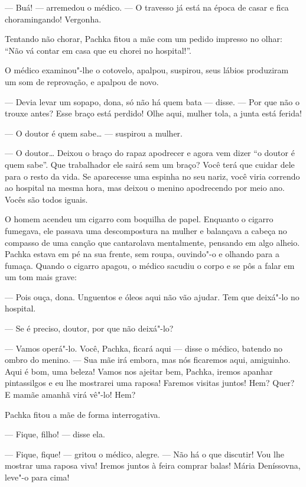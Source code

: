 --- Buá! --- arremedou o médico. --- O travesso já está na época de
casar e fica choramingando! Vergonha.

Tentando não chorar, Pachka fitou a mãe com um pedido impresso no olhar:
``Não vá contar em casa que eu chorei no hospital!''.

O médico examinou"-lhe o cotovelo, apalpou, suspirou, seus lábios
produziram um som de reprovação, e apalpou de novo.

--- Devia levar um sopapo, dona, só não há quem bata --- disse. --- Por
que não o trouxe antes? Esse braço está perdido! Olhe aqui, mulher tola,
a junta está ferida!

--- O doutor é quem sabe\ldots{} --- suspirou a mulher.

--- O doutor\ldots{} Deixou o braço do rapaz apodrecer e agora vem dizer ``o
doutor é quem sabe''. Que trabalhador ele sairá sem um braço? Você terá
que cuidar dele para o resto da vida. Se aparecesse uma espinha no seu
nariz, você viria correndo ao hospital na mesma hora, mas deixou o
menino apodrecendo por meio ano. Vocês são todos iguais.

O homem acendeu um cigarro com boquilha de papel. Enquanto o
cigarro fumegava, ele passava uma descompostura na mulher e balançava a
cabeça no compasso de uma canção que cantarolava mentalmente, pensando
em algo alheio. Pachka estava em pé na sua frente, sem
roupa, ouvindo"-o e olhando para a fumaça. Quando o cigarro apagou, o
médico sacudiu o corpo e se pôs a falar em um tom mais grave:

--- Pois ouça, dona. Unguentos e óleos aqui não vão ajudar. Tem que
deixá"-lo no hospital.

--- Se é preciso, doutor, por que não deixá"-lo?

--- Vamos operá"-lo. Você, Pachka, ficará aqui --- disse o médico,
batendo no ombro do menino. --- Sua mãe irá embora, mas nós ficaremos
aqui, amiguinho. Aqui é bom, uma beleza! Vamos nos ajeitar bem, Pachka,
iremos apanhar pintassilgos e eu lhe mostrarei uma raposa! Faremos
visitas juntos! Hem? Quer? E mamãe amanhã virá vê"-lo! Hem?

Pachka fitou a mãe de forma interrogativa.

--- Fique, filho! --- disse ela.

--- Fique, fique! --- gritou o médico, alegre. --- Não há o que
discutir! Vou lhe mostrar uma raposa viva! Iremos juntos à feira comprar
balas! Mária Deníssovna, leve"-o para cima!

